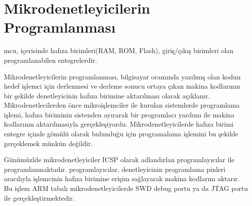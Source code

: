 \chapter{Mikrodenetleyicilerin Programlanması}

\acrfull{mcu}, içerisinde hafıza birimleri(RAM, ROM, Flash), giriş/çıkış birimleri olan programlanabilen entegrelerdir.

Mikrodenetleyicilerin programlanması, bilgisayar oramında yazılmış olan kodun hedef işlemci için derlenmesi
ve derleme sonucu ortaya çıkan makina kodlarının bir şekilde denetleyicinin hafıza birimine aktarılması olarak açıklanır.
Mikrodenetlecilerden önce mikroişlemciler ile kurulan sistemlerde programlama işlemi, hafıza biriminin sistenden ayırarak
bir programlacı yardımı ile makina kodlarının aktarılmasıyla gerçekleşiyordu. Mikrodenetleyicilerde hafıza birimi entegre
içinde gömülü olarak bulunduğu için programalama işlemini bu şekilde gerçeklemek münkün değildir.

Günümüzlde mikrodenetleyiciler \acrfull{ICSP} olarak adlandırlan programlayıcılar ile programlanmaktadır.  programlayıcılar,
denetleyicinin programlama pinleri aracılıyla işlemcinin hafıza birimine erişim sağlayarak makina kodlarını aktarır.
Bu işlem ARM tabalı mikrodenetleyicilerde \acrfull{SWD} debug portu ya da JTAG portu ile gerçekleştirmektedir.

